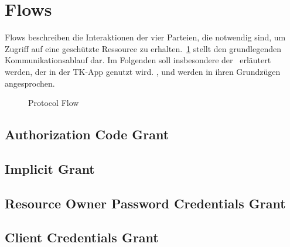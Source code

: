\section{Flows} Flows beschreiben die Interaktionen der vier Parteien, die
notwendig sind, um Zugriff auf eine geschützte Ressource zu erhalten.~\ref{fig: Protocol FLow} stellt den grundlegenden Kommunikationsablauf dar. Im Folgenden soll insbesondere der~ erläutert werden, der in der TK-App genutzt wird. ,  und  werden in ihren Grundzügen angesprochen.

\begin{figure}[h]
    
    \caption{Protocol Flow}\label{fig: Protocol FLow}
\end{figure}


\subsection{Authorization Code Grant} \label{ssec:authcode}
\subsection{Implicit Grant}\label{ssec:implicit}
\subsection{Resource Owner Password Credentials Grant}\label{ssec:passwordcred}
\subsection{Client Credentials Grant}\label{ssec:clientcred}


\blindtext{}
